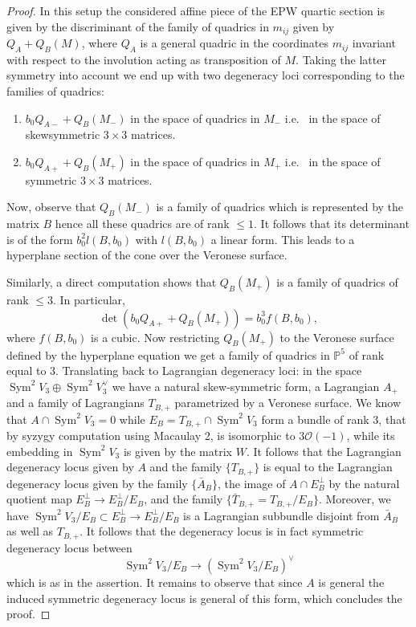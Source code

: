 \documentclass{amsart}
\theoremstyle{definition}
\numberwithin{equation}{section}
\numberwithin{equation}{section} \theoremstyle{definition}
\DeclareMathOperator{\Sym}{Sym} \DeclareMathOperator{\sing}{sing}
\begin{document}
\begin{proof}
 In this setup the considered affine piece of the EPW quartic section is given by the discriminant of the family of quadrics in $m_{ij}$ given by $Q_A +Q_B(M)$, %
 where $Q_A$ is a general quadric in the coordinates $m_{ij}$ invariant with respect to the involution acting as transposition of $M$.
Taking the latter symmetry into account we end up with two degeneracy loci corresponding to the families of quadrics:
\begin{enumerate}
\item $b_0 Q_{A-} +Q_B(M_-)$ in the space of quadrics in $M_-$ i.e.~ in the space of skewsymmetric $3\times 3$ matrices.
\item $b_0 Q_{A+} +Q_B(M_+)$ in the space of quadrics in $M_+$ i.e.~ in the space of symmetric $3\times 3$ matrices.
\end{enumerate}
Now, observe that $Q_B(M_-)$ is a family of quadrics which is represented by the matrix $B$ hence all these quadrics are of rank $\leq 1$. It follows that its determinant is of the form $b_0^2l(B,b_0)$ with $l(B,b_0)$ a linear form. This leads to a hyperplane section of the cone over the Veronese surface. 

Similarly, a direct computation shows that $Q_B(M_+)$ is a family of quadrics of rank $\leq 3$. In particular,  
$$\det (b_0 Q_{A+} +Q_B(M_+))=b_0^3 f(B,b_0),$$
where $f(B,b_0)$ is a cubic. Now restricting $Q_B(M_+)$ to the Veronese surface defined by the hyperplane equation we get a family of quadrics in $\mathbb P^5$ of rank equal to 3. Translating back to Lagrangian degeneracy loci: in the space
$\Sym^2 V_3\oplus \Sym^2 V_3^{\vee}$ we have a natural skew-symmetric form, a Lagrangian $A_+$ and a family of Lagrangians $T_{B,+}$ parametrized by a Veronese surface. We know that 
$A\cap \Sym^2 V_3=0$ while $E_B=T_{B,+}\cap \Sym^2 V_3$ form a bundle of rank 3, that by syzygy computation using Macaulay 2, is isomorphic to $3\mathcal O(-1)$, while its embedding in $\Sym^2 V_3$ is given by the matrix $W$. It follows that the Lagrangian degeneracy locus given by $A$ and the family $\{T_{B,+}\}$ is equal to the Lagrangian degeneracy locus given by the family $\{\bar A_B\}$, the image of $A\cap E_B^{\perp}$ by the natural quotient map $E_B^{\perp}\to E_B^{\perp}/E_B$, and the family $\{\bar T_{B,+}=T_{B,+}/E_B\}$. Moreover, we have $\Sym^2 V_3/E_B \subset E_B^{\perp}\to E_B^{\perp}/E_B$ is a Lagrangian subbundle disjoint from $\bar A_B$ as well as $T_{B,+}$. It follows that the degeneracy locus  is in fact symmetric degeneracy locus between $$\Sym^2 V_3/E_B \to (\Sym^2 V_3/E_B)^{\vee}$$ which is as in the assertion.
It remains to observe that since $A$ is general the induced symmetric degeneracy locus is general of this form, which concludes the proof.\end{proof}
\end{document}
